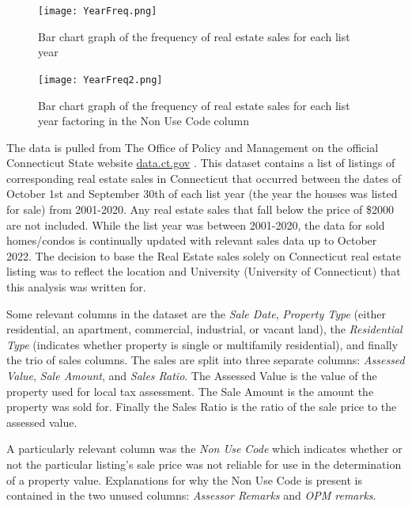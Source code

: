 \documentclass[12pt]{article}
\begin{document}
\begin{figure}[!t]
  \centering
  \texttt{[image: YearFreq.png]}
  \caption{Bar chart graph of the frequency of real estate sales for each list year}
  \label{fig:YearFreq}
\end{figure}

\begin{figure}[!t]
  \centering
  \texttt{[image: YearFreq2.png]}
  \caption{Bar chart graph of the frequency of real estate sales for each list year factoring in the Non Use Code column}
  \label{fig:YearFreq2}
\end{figure}

The data is pulled from The Office of Policy and Management on the official Connecticut State website  \href{data.ct.gov/Housing-and-Development/Real-Estate-Sales-2001-2020-GL/5mzw-sjtu}{data.ct.gov} \citep{realestatedata}. This dataset contains a list of listings of corresponding real estate sales in Connecticut that occurred between the dates of October 1st and September 30th of each list year (the year the houses was listed for sale) from 2001-2020. Any real estate sales that fall below the price of \$2000 are not included. While the list year was between 2001-2020, the data for sold homes/condos is continually updated with relevant sales data up to October 2022. The decision to base the Real Estate sales solely on Connecticut real estate listing was to reflect the location and University (University of Connecticut) that this analysis was written for.

Some relevant columns in the dataset are the \textit{Sale Date}, \textit{Property Type} (either residential, an apartment, commercial, industrial, or vacant land), the \textit{Residential Type }(indicates whether property is single or multifamily residential), and finally the trio of sales columns. The sales are split into three separate columns: \textit{Assessed Value}, \textit{Sale Amount}, and \textit{Sales Ratio}. The Assessed Value is the value of the property used for local tax assessment. The Sale Amount is the amount the property was sold for. Finally the Sales Ratio is the ratio of the sale price to the assessed value. 

A particularly relevant column was the \textit{Non Use Code} which indicates whether or not the particular listing's sale price was not reliable for use in the determination of a property value. Explanations for why the Non Use Code is present is contained in the two unused columns: \textit{Assessor Remarks} and \textit{OPM remarks}.
\end{document}
